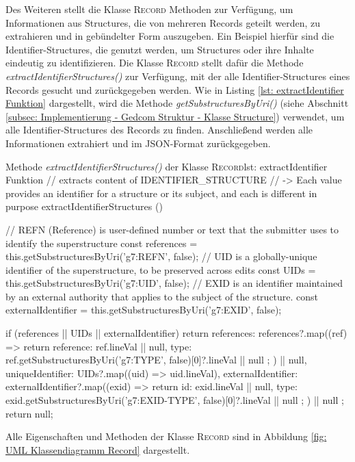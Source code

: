 Des Weiteren stellt die Klasse \textsc{Record} Methoden zur Verfügung, um Informationen aus Structures, die von mehreren Records geteilt werden, zu extrahieren und in gebündelter Form auszugeben. Ein Beispiel hierfür sind die Identifier-Structures, die genutzt werden, um Structures oder ihre Inhalte eindeutig zu identifizieren. Die Klasse \textsc{Record} stellt dafür die Methode \textit{extractIdentifierStructures()} zur Verfügung, mit der alle Identifier-Structures eines Records gesucht und zurückgegeben werden. Wie in Listing \ref{lst: extractIdentifier Funktion} dargestellt, wird die Methode \textit{getSubstructuresByUri()} (siehe Abschnitt \ref{subsec: Implementierung - Gedcom Struktur - Klasse Structure}) verwendet, um alle Identifier-Structures des Records zu finden. Anschließend werden alle Informationen extrahiert und im JSON-Format zurückgegeben. 
\vspace{1em}
\begin{javascript}{Methode \textit{extractIdentifierStructures()} der Klasse \textsc{Record}}{lst: extractIdentifier Funktion}
	// extracts content of IDENTIFIER_STRUCTURE
	//  -> Each value provides an identifier for a structure or its subject, and each is different in purpose
	extractIdentifierStructures () {
		// REFN (Reference) is user-defined number or text that the submitter uses to identify the superstructure
		const references = this.getSubstructuresByUri('g7:REFN', false);
		// UID is a globally-unique identifier of the superstructure, to be preserved across edits
		const UIDs = this.getSubstructuresByUri('g7:UID', false);
		// EXID is an identifier maintained by an external authority that applies to the subject of the structure.
		const externalIdentifier = this.getSubstructuresByUri('g7:EXID', false);
		
		if (references || UIDs || externalIdentifier) {
			return {
				references: references?.map((ref) => {
					return {
						reference: ref.lineVal || null,
						type: ref.getSubstructuresByUri('g7:TYPE', false)[0]?.lineVal || null
					};
				}) || null,
				uniqueIdentifier: UIDs?.map((uid) => uid.lineVal),
				externalIdentifier: externalIdentifier?.map((exid) => {
					return {
						id: exid.lineVal || null,
						type: exid.getSubstructuresByUri('g7:EXID-TYPE', false)[0]?.lineVal || null
					};
				}) || null
			};
		}
		return null;
	}	
\end{javascript}
\vspace{1em}
Alle Eigenschaften und Methoden der Klasse \textsc{Record} sind in Abbildung \ref{fig: UML Klassendiagramm Record} dargestellt.

